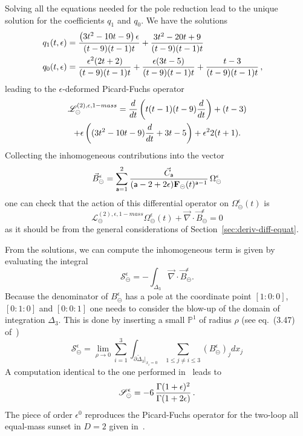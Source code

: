 \documentclass[a4paper,12pt]{article}
\newcommand\lNote[1]{
	\todo[backgroundcolor=red!20!white,fancyline,
	bordercolor=white]{ LDLC:  #1}}
\numberwithin{equation}{section}
\numberwithin{figure}{section}
\def\su{\circleddash}
\begin{document}
%
Solving all the equations needed for the pole reduction lead
to the unique solution for the coefficients $q_1$ and $q_0$. 
We have the solutions
\begin{align}
  q_1(t,\epsilon)&=\frac{\left(3 t^2-10 t-9\right) \epsilon }{(t-9) (t-1) t}+\frac{3 t^2-20 t+9}{(t-9) (t-1)
   t}\cr
  q_0(t,\epsilon)&=\frac{\epsilon ^2 (2 t+2)}{(t-9) (t-1) t}+\frac{\epsilon  (3 t-5)}{(t-9) (t-1)
   t}+\frac{t-3}{(t-9) (t-1) t} \, ,
\end{align}
leading to the $\epsilon$-deformed \lNote{nomenclature} Picard-Fuchs operator
\begin{multline}
  \label{e:PF2sunset1massepsilon}
     \mathscr{L}^{(2),\epsilon,1-mass}_\su ={d\over dt}\left( t(t-1)(t-9)
       {d\over dt}\right)+(t-3)\cr+\epsilon\left((3t^2-10t-9) {d\over
         dt}+3t-5\right)
     +\epsilon^2 2(t+1).
\end{multline}
%
Collecting the inhomogeneous contributions into the vector
\begin{equation}
  \vec B_\su^\epsilon=\sum_{\mathsf{a}=1}^2 {\vec C_{\mathsf{a}}\over
    (\mathsf{a}-2+2\epsilon)\textbf{F}_\su(t)^{\mathsf{a}-1}}\, \Omega_\su^\epsilon
\end{equation}
one can check that the action of this differential operator on
$\Omega_{\su}^\epsilon(t)$ is
\begin{equation}
      \mathscr{L}^{(2),\epsilon,1-mass}_\su
      \Omega_{\su}^\epsilon(t)+\vec\nabla \cdot\vec B_\su^\epsilon=0
    \end{equation}
as it should be from the general considerations of Section~\ref{sec:deriv-diff-equat}.


\medskip
From the solutions, we can compute the  inhomogeneous term is given by evaluating the integral 
\begin{equation}
  \mathscr{S}_\su^\epsilon
  =-\int_{\Delta_3} \vec\nabla\cdot\vec B^\epsilon_\su.
\end{equation}
%
Because the denominator of $ B^\epsilon_\su$ has a pole at the coordinate
point $[1:0:0]$, $[0:1:0]$ and $[0:0:1]$ one needs to consider the
blow-up  of the domain of integration $\Delta_3$. This is done by inserting a small
$\mathbb P^1$ of radius $\rho$ (see eq.~(3.47) of~\cite{Bloch:2016izu})
\begin{equation}
    \mathscr{S}_\su^\epsilon=\lim_{\rho\to0} \sum_{i=1}^3
    \int_{\partial\tilde\Delta_3|_{x_i=0}} \sum_{1\leq j\neq i\leq 3}
    (B^\epsilon_\su)_j dx_j
\end{equation}
A computation identical to the one performed in~\cite{Bloch:2016izu} leads to
\begin{equation}
 \mathscr{S}_\su^\epsilon=  -6 \, {\Gamma(1+\epsilon)^2\over \Gamma(1+2\epsilon)} \, . 
\end{equation}
The piece of order $\epsilon^0$ reproduces the Picard-Fuchs operator
for the two-loop all equal-mass sunset in $D=2$ given
in~\cite{Bloch:2013tra,Bloch:2013tra,Vanhove:2014wqa,Bonisch:2020qmm,Pogel:2022vat}.
\end{document}
